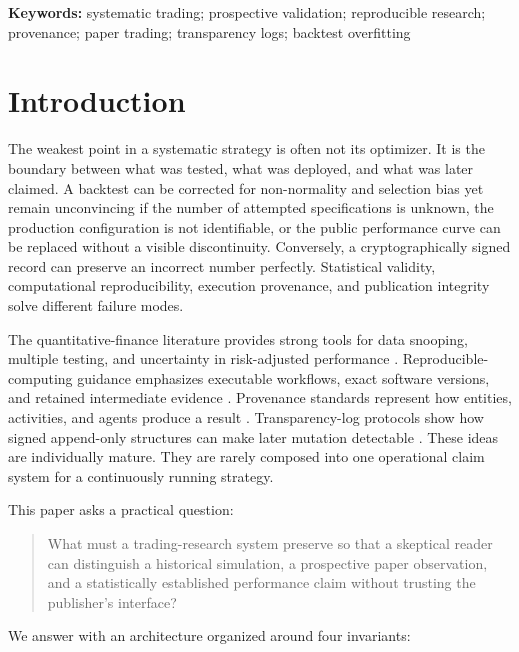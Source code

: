 \documentclass[11pt]{article}
\begin{document}
\textbf{Keywords:} systematic trading; prospective validation; reproducible research; provenance; paper trading; transparency logs; backtest overfitting

\section{Introduction}

The weakest point in a systematic strategy is often not its optimizer. It is the boundary between what was tested, what was deployed, and what was later claimed. A backtest can be corrected for non-normality and selection bias yet remain unconvincing if the number of attempted specifications is unknown, the production configuration is not identifiable, or the public performance curve can be replaced without a visible discontinuity. Conversely, a cryptographically signed record can preserve an incorrect number perfectly. Statistical validity, computational reproducibility, execution provenance, and publication integrity solve different failure modes.

The quantitative-finance literature provides strong tools for data snooping, multiple testing, and uncertainty in risk-adjusted performance \cite{white2000reality,lo2002statistics,bailey2014deflated,bailey2017pbo,harvey2016crosssection}. Reproducible-computing guidance emphasizes executable workflows, exact software versions, and retained intermediate evidence \cite{sandve2013ten}. Provenance standards represent how entities, activities, and agents produce a result \cite{w3c2013prov}. Transparency-log protocols show how signed append-only structures can make later mutation detectable \cite{laurie2021ct}. These ideas are individually mature. They are rarely composed into one operational claim system for a continuously running strategy.

This paper asks a practical question:

\begin{quote}
What must a trading-research system preserve so that a skeptical reader can distinguish a historical simulation, a prospective paper observation, and a statistically established performance claim without trusting the publisher's interface?
\end{quote}

We answer with an architecture organized around four invariants:
\end{document}
